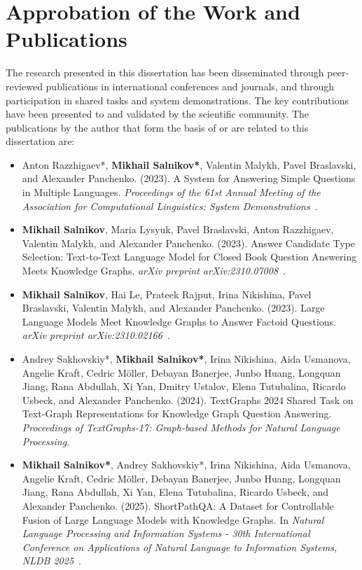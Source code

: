 \section*{Approbation of the Work and Publications}
\label{sec:synopsis:approbation}
The research presented in this dissertation has been disseminated through peer-reviewed publications in international conferences and journals, and through participation in shared tasks and system demonstrations. The key contributions have been presented to and validated by the scientific community.
The publications by the author that form the basis of or are related to this dissertation are:
\begin{itemize}
    \item Anton Razzhigaev*, \textbf{Mikhail Salnikov*}, Valentin Malykh, Pavel Braslavski, and Alexander Panchenko. (2023). A System for Answering Simple Questions in Multiple Languages. \textit{Proceedings of the 61st Annual Meeting of the Association for Computational Linguistics: System Demonstrations}~\cite{DBLP:conf/acl/RazzhigaevSMBP23}.
    \item \textbf{Mikhail Salnikov}, Maria Lysyuk, Pavel Braslavski, Anton Razzhigaev, Valentin Malykh, and Alexander Panchenko. (2023). Answer Candidate Type Selection: Text-to-Text Language Model for Closed Book Question Answering Meets Knowledge Graphs. \textit{arXiv preprint arXiv:2310.07008}~\cite{DBLP:journals/corr/abs-2310-07008}.
    \item \textbf{Mikhail Salnikov}, Hai Le, Prateek Rajput, Irina Nikishina, Pavel Braslavski, Valentin Malykh, and Alexander Panchenko. (2023). Large Language Models Meet Knowledge Graphs to Answer Factoid Questions. \textit{arXiv preprint arXiv:2310.02166}~\cite{DBLP:journals/corr/abs-2310-02166}.
    \item Andrey Sakhovskiy*, \textbf{Mikhail Salnikov*}, Irina Nikishina, Aida Usmanova, Angelie Kraft, Cedric Möller, Debayan Banerjee, Junbo Huang, Longquan Jiang, Rana Abdullah, Xi Yan, Dmitry Ustalov, Elena Tutubalina, Ricardo Usbeck, and Alexander Panchenko. (2024). TextGraphs 2024 Shared Task on Text-Graph Representations for Knowledge Graph Question Answering. \textit{Proceedings of TextGraphs-17: Graph-based Methods for Natural Language Processing}.
    \item \textbf{Mikhail Salnikov*}, Andrey Sakhovskiy*, Irina Nikishina, Aida Usmanova, Angelie Kraft, Cedric Möller, Debayan Banerjee, Junbo Huang, Longquan Jiang, Rana Abdullah, Xi Yan, Elena Tutubalina, Ricardo Usbeck, and Alexander Panchenko. (2025). ShortPathQA: A Dataset for Controllable Fusion of Large Language Models with Knowledge Graphs. In \textit{Natural Language Processing and Information Systems - 30th International Conference on Applications of Natural Language to Information Systems, NLDB 2025}~\cite{DBLP:conf/nldb/SalnikovSPQA25}.

\end{itemize}
